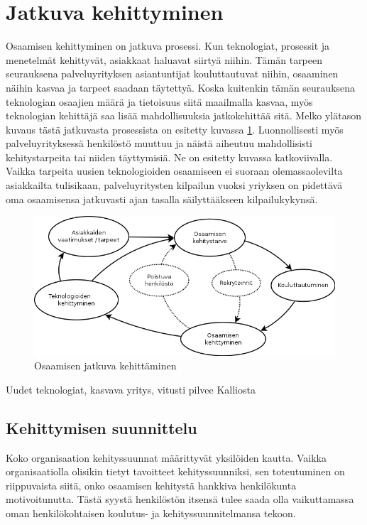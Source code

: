 \documentclass[a4paper,finnish,12pt]{article}
\begin{document}
\pagebreak

\section{Jatkuva kehittyminen}

Osaamisen kehittyminen on jatkuva prosessi. Kun teknologiat, prosessit ja menetelmät kehittyvät, asiakkaat haluavat siirtyä niihin. Tämän tarpeen seurauksena palveluyrityksen asiantuntijat kouluttautuvat niihin, osaaminen näihin kasvaa ja tarpeet saadaan täytettyä. Koska kuitenkin tämän seurauksena teknologian osaajien määrä ja tietoisuus siitä maailmalla kasvaa, myös teknologian kehittäjä saa lisää mahdollisuuksia jatkokehittää sitä. Melko ylätason kuvaus tästä jatkuvasta prosessista on esitetty kuvassa \ref{fig:perusympyra}. Luonnollisesti myös palveluyrityksessä henkilöstö muuttuu ja näistä aiheutuu mahdollisisti kehitystarpeita tai niiden täyttymisiä. Ne on esitetty kuvassa katkoviivalla. Vaikka tarpeita uusien teknologioiden osaamiseen ei suoraan olemassaolevilta asiakkailta tulisikaan, palveluyritysten kilpailun vuoksi yriyksen on pidettävä oma osaamisensa jatkuvasti ajan tasalla säilyttääkseen kilpailukykynsä.

\begin{figure}[ht]
\centering
\includegraphics[scale=0.5]{knowledge_circle.png}
\caption{Osaamisen jatkuva kehittäminen}
\label{fig:perusympyra}
\end{figure}

Uudet teknologiat, kasvava yritys, vitusti pilvee Kalliosta

\subsection{Kehittymisen suunnittelu}

Koko organisaation kehityssuunnat määrittyvät yksilöiden kautta. Vaikka organisaatiolla olisikin tietyt tavoitteet kehityssuunniksi, sen toteutuminen on riippuvaista siitä, onko osaamisen kehitystä hankkiva henkilökunta motivoitunutta. Tästä syystä henkilöstön itsensä tulee saada olla vaikuttamassa oman henkilökohtaisen koulutus- ja kehityssuunnitelmansa tekoon.
\end{document}
